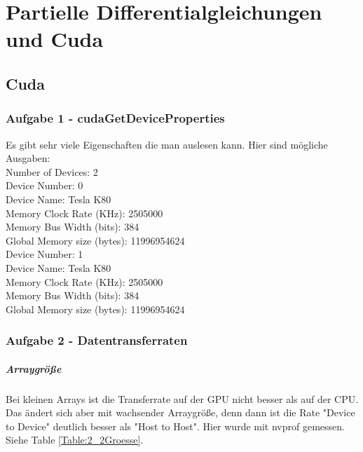 \documentclass{report}
\begin{document}
\newpage

\chapter{Partielle Differentialgleichungen und Cuda}
\section{Cuda}
\subsection{Aufgabe 1 - cudaGetDeviceProperties}

Es gibt sehr viele Eigenschaften die man auslesen kann. Hier sind mögliche Ausgaben: \\

Number of Devices: 2\\
Device Number:                0\\
Device Name:                  Tesla K80\\
Memory Clock Rate (KHz):      2505000\\
Memory Bus Width (bits):      384\\
Global Memory size (bytes):   11996954624\\
Device Number:                1\\
Device Name:                  Tesla K80\\
Memory Clock Rate (KHz):      2505000\\
Memory Bus Width (bits):      384\\
Global Memory size (bytes):   11996954624\\

\subsection{Aufgabe 2 - Datentransferraten}

\paragraph{Arraygröße} Bei kleinen Arrays ist die Transferrate auf der GPU nicht besser als auf der CPU. Das ändert sich aber mit wachsender Arraygröße, denn dann ist die Rate "Device to Device" deutlich besser als "Host to Host".
Hier wurde mit nvprof gemessen. Siehe Table \ref{Table:2_2Groesse}.
\end{document}
